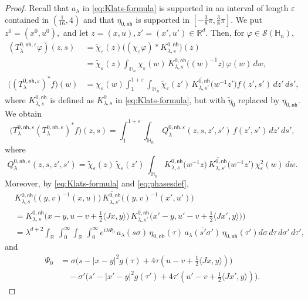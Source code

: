 \documentclass[leqno]{amsart}
\theoremstyle{definition}
\theoremstyle{remark}
\numberwithin{equation}{section}
\newcommand{\R}{\mathbb{R}}
\newcommand\la{{\lambda}}
\newcommand\bbH{{\mathbb {H}}}
\newcommand\cS{{\mathcal {S}}}
\newcommand\ve{{\varepsilon}}
\begin{document}
\begin{proof}
Recall that $a_\lambda$ in \eqref{eq:Klats-formula} is supported in an interval of length $\ve$ contained in $(\frac1{16},4)$ and that $\eta_{0,\mathsf{nh}}$ is supported in $[-\frac38\pi,\frac38\pi]$.
We put $z^0=(x^0,u^0),$ and let $z=(x,u), z'=(x',u')\in\R^d.$ Then, for $\varphi\in\cS(\bbH_n),$
\begin{align*}
(T^{0,\mathsf{nh},\varepsilon}_\lambda \varphi)(z,s)
 & = \tilde\chi_{\varepsilon}(z)\big((\chi_{\varepsilon} \varphi)*K_{\lambda,s}^{0,\mathsf{nh}}\big) (z) \\
 & = \tilde\chi_{\varepsilon}(z)\int_{\bbH_n}\chi_{\varepsilon} (w) \,  K^{0,\mathsf{nh}}_{\lambda,s}\big((w)^{-1}z\big) \, \varphi(w)\, dw,\\
\big((T^{0,\mathsf{nh},\varepsilon}_\la)^*f\big) (w)
&= \chi_{\varepsilon} (w) \int_1^{1+\ve} \int_{\bbH_n} \tilde \chi_\ve(z')\, \overline{ K_{\lambda,s'}^{0,\mathsf{nh}}}\big(w^{-1}z'\big)f(z',s')\, dz' \,ds',
\end{align*}
where $K_{\lambda,s}^{0,\mathsf{nh}}$ is defined as $K_{\lambda,s}^{0}$ in \eqref{eq:Klats-formula}, but with $\tilde \eta_{0}$ replaced by $\eta_{0,\mathsf{nh}}$.
We obtain
\[
\big(T^{0,\mathsf{nh},\varepsilon}_\la (T^{0,\mathsf{nh},\varepsilon}_\la)^*f\big)(z,s)
 = \int_1^{1+\ve} \int_{\bbH_n} \, Q^{0,\mathsf{nh},\varepsilon}_\lambda(z,s,z',s') \,  f(z',s')\, dz'\, ds',
\]
where
\[
 Q^{0,\mathsf{nh},\varepsilon}_\lambda(z,s,z',s') =\tilde \chi_{\varepsilon}(z) \, \tilde\chi_{\varepsilon}(z') \,
  \int_{\bbH_n} K_{\lambda,s}^{0,\mathsf{nh}}\big(w^{-1}z\big) \, \overline{ K_{\lambda,s'}^{0,\mathsf{nh}}}\big(w^{-1}z'\big) \, \chi_{\varepsilon}^2(w) \, dw. 
\]
Moreover, by \eqref{eq:Klats-formula} and \eqref{eq:phasesdef},
\begin{align*}
& K_{\lambda,s}^{0,\mathsf{nh}}\big((y,v)^{-1}(x,u)\big) \, \overline{ K_{\lambda,s'}^{0,\mathsf{nh}}}\big((y,v)^{-1}(x',u')\big)\\
&= K_{\lambda,s}^{0,\mathsf{nh}}\big(x-y,u-v + \tfrac12\langle Jx,y\rangle\big) \, \overline{ K_{\lambda,s'}^{0,\mathsf{nh}}}\big(x'-y,u'-v + \tfrac12\langle Jx',y\rangle)\big) \\ 
&= \lambda^{d+2} \int_\R \, \int_0^\infty \int_\R \, \int_0^\infty e^{i\lambda\Psi_0} \, a_\lambda(s\sigma) \, \eta_{0,\mathsf{nh}}(\tau)  \,\overline{a_\lambda(s'\sigma')} \,\eta_{0,\mathsf{nh}}(\tau')  d\sigma \, d\tau \, d\sigma ' \, d\tau',
\end{align*}
and
\begin{align*}
\Psi_0 & = \sigma\big(s-\left|x-y\right|^2g(\tau) + 4 \tau(u-v + \tfrac12 \langle Jx,y\rangle)\big)\\
 &\quad -\sigma'\big(s'-\left|x'-y\right|^2g(\tau') + 4 \tau' (u'-v + \tfrac12 \langle Jx',y\rangle)\big).
\end{align*}


\end{proof}
\end{document}
